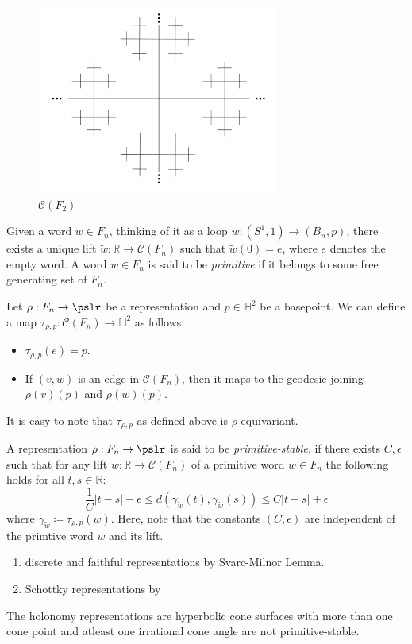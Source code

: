 \begin{figure}[h]
	\includegraphics[width=8cm]{Chapter1/CayleyGraphF2.pdf}
	\caption{$\mathcal{C}(F_2)$}
	\label{fig:F2}
\end{figure}

Given a word $w \in F_n$, thinking of it as a loop $w: (S^1,1) \rightarrow (B_n, p)$, there exists a unique lift $\tilde{w}: \mathbb{R} \rightarrow \mathcal{C}(F_n)$ such that $\tilde{w}(0) = e$, where $e$ denotes the empty word. A word $w \in F_n$ is said to be \textit{primitive} if it belongs to some free generating set of $F_n$. 

Let $\rho: F_n \rightarrow \pslr$ be a representation and $p \in \mathbb{H}^2$ be a basepoint. We can define a map $\tau_{\rho,p}: \mathcal{C}(F_n) \rightarrow \mathbb{H}^2$ as follows:
\begin{itemize}
	\item $\tau_{\rho,p}(e) = p$.
	\item If $(v,w)$ is an edge in $\mathcal{C}(F_n)$, then it maps to the geodesic joining $\rho(v)(p)$ and $\rho(w)(p)$.
\end{itemize}
It is easy to note that $\tau_{\rho,p}$ as defined above is $\rho$-equivariant.

\begin{defn}
	A representation $\rho:F_n \rightarrow \pslr$ is said to be \textit{primitive-stable}, if there exists $C,\epsilon$ such that for any lift $\tilde{w}: \mathbb{R} \rightarrow \mathcal{C}(F_n)$ of a primitive word $w \in F_n$ the following holds for all $t,s \in \mathbb{R}$:
	\[\dfrac{1}{C}|t-s| - \epsilon \leq d(\gamma_{\tilde{w}}(t),\gamma_{\tilde{w}}(s)) \leq C|t-s|+ \epsilon\] 
	where $\gamma_{\tilde{w}} \coloneqq \tau_{\rho,p}(\tilde{w})$. Here, note that the constants $(C, \epsilon)$ are independent of the primtive word $w$ and its lift.
\end{defn}

\begin{exmp}
	\begin{enumerate}
		\item discrete and faithful representations by Svarc-Milnor Lemma.
		\item Schottky representations by \cite[Lemma 3.2]{Minsky}
	\end{enumerate}
\end{exmp}
\begin{prop}
	The holonomy representations are hyperbolic cone surfaces with more than one cone point and atleast one irrational cone angle are not primitive-stable.
\end{prop}

